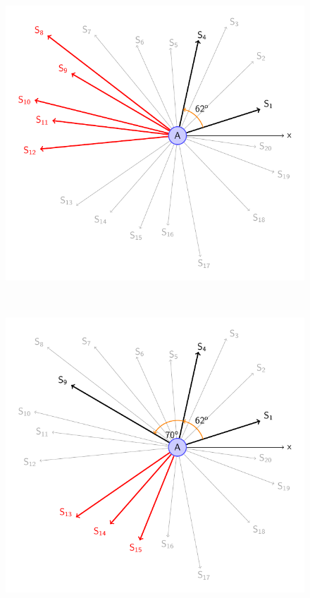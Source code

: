 \begin{figure}[!h]
\begin{minipage}{.3\linewidth}
	\end{minipage}
	\hfill
	\begin{minipage}{.3\linewidth}
		\includegraphics[scale=.5]{setSensors_3.pdf}
	\end{minipage}
	\\
	\begin{minipage}{.3\linewidth}
		\includegraphics[scale=.5]{setSensors_4.pdf}

\end{minipage}
\end{figure}
